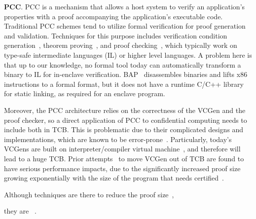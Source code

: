 \vspace{3pt}\noindent\textbf{PCC}. PCC is a mechanism that allows a host system to verify an application's properties with a proof accompanying the application's executable code.
\DIFdelbegin {}\DIFdelend Traditional PCC schemes tend to utilize formal verification for proof generation and validation. Techniques for this purpose includes verification condition generation~\cite{homeier1995mechanically,colby2000certifying}, theorem proving~\cite{paulson2000isabelle,de2008z3,bertot2013interactive}, and proof checking~\cite{appel2003trustworthy}, which typically work on type-safe intermediate languages (IL) or higher level languages. A problem here is that up to our knowledge, no formal tool today can automatically transform a binary to IL for in-enclave verification. BAP~\cite{brumley2011bap} disassembles binaries and lifts x86 instructions to a formal format, but it does not have a runtime C/C++ library %
for static linking, as required for an enclave program.
\DIFdelbegin %

\DIFdelend Moreover, the PCC architecture relies on the correctness of the VCGen and the proof checker, so a direct application of PCC to confidential computing needs to include both in TCB. This is problematic due to their complicated designs and implementations, which are known to be error-prone~\cite{necula2001oracle}. Particularly, today's VCGens are built on \DIFaddbegin {}\DIFaddend interpreter/compiler \DIFdelbegin {}\DIFdelend \DIFaddbegin {}\DIFaddend virtual machine~\cite{leroy2006formal}, and therefore will lead to a huge TCB. Prior attempts~\cite{appel2001foundational} to move VCGen out of TCB are found to have serious performance impacts, due to the significantly increased proof size growing exponentially with the size of the program that needs \DIFaddbegin {}\DIFaddend certified~\cite{necula1997proof}.  Although techniques are there to reduce the proof size~\cite{appel2001foundational,pirzadeh2010extended}, they are \DIFdelbegin {}\DIFdelend \DIFaddbegin {}\DIFaddend ~\cite{appel2003trustworthy}. 
